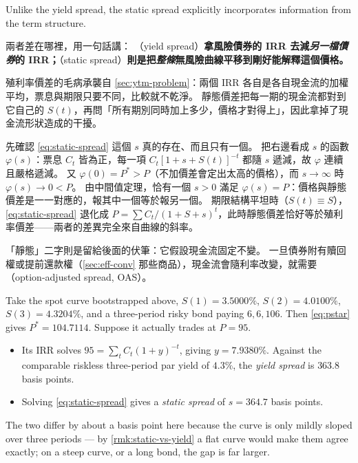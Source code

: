 Unlike the yield spread, the static spread explicitly incorporates information from the term structure.

\suppstart
\begin{remark}
	\label{rmk:static-vs-yield}
	兩者差在哪裡，用一句話講：
	（yield spread）\textbf{拿風險債券的 IRR 去減\emph{另一檔債券}的 IRR；}（static spread）\textbf{則是把\emph{整條}無風險曲線平移到剛好能解釋這個價格。}

	殖利率價差的毛病承襲自 \autoref{sec:ytm-problem}：兩個 IRR 各自是各自現金流的加權平均，票息與期限只要不同，比較就不乾淨。
	靜態價差把每一期的現金流都對到它自己的 $S(t)$，再問「所有期別同時加上多少，價格才對得上」，因此拿掉了現金流形狀造成的干擾。

	先確認 \eqref{eq:static-spread} 這個 $s$ 真的存在、而且只有一個。
	把右邊看成 $s$ 的函數 $\varphi(s)$：票息 $C_{t}$ 皆為正，每一項 $C_{t}[1+s+S(t)]^{-t}$ 都隨 $s$ 遞減，故 $\varphi$ 連續且嚴格遞減。
	又 $\varphi(0)=P^{*}>P$（不加價差會定出太高的價格），而 $s\to\infty$ 時 $\varphi(s)\to 0<P$。
	由中間值定理，恰有一個 $s>0$ 滿足 $\varphi(s)=P$：價格與靜態價差是一一對應的，報其中一個等於報另一個。
	期限結構平坦時（$S(t)\equiv S$），\eqref{eq:static-spread} 退化成 $P=\sum C_t/(1+S+s)^t$，此時靜態價差恰好等於殖利率價差——兩者的差異完全來自曲線的斜率。

	「靜態」二字則是留給後面的伏筆：它假設現金流固定不變。
	一旦債券附有贖回權或提前還款權（\autoref{sec:eff-conv} 那些商品），現金流會隨利率改變，就需要（option-adjusted spread, OAS）。
\end{remark}

\begin{eg}
	Take the spot curve bootstrapped above, $S(1)=3.5000\%$, $S(2)=4.0100\%$, $S(3)=4.3204\%$, and a three-period risky bond paying $6,6,106$.
	Then \eqref{eq:pstar} gives $P^{*}=104.7114$.
	Suppose it actually trades at $P=95$.

	\begin{itemize}[nosep]
		\item Its IRR solves $95=\sum_{t}C_{t}(1+y)^{-t}$, giving $y=7.9380\%$.
		      Against the comparable riskless three-period par yield of $4.3\%$, the \emph{yield spread} is $363.8$ basis points.
		\item Solving \eqref{eq:static-spread} gives a \emph{static spread} of $s=364.7$ basis points.
	\end{itemize}

	The two differ by about a basis point here because the curve is only mildly sloped over three periods --- by \autoref{rmk:static-vs-yield} a flat curve would make them agree exactly; on a steep curve, or a long bond, the gap is far larger.
\end{eg}
\suppend


